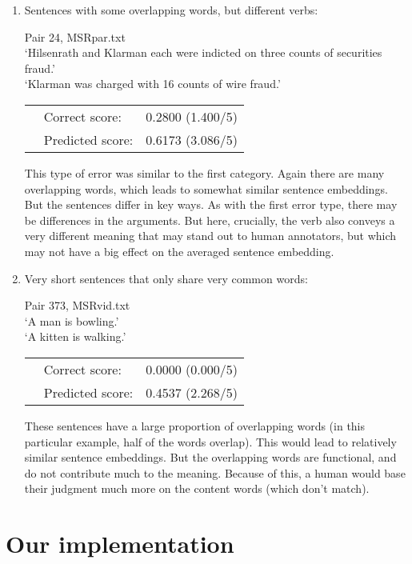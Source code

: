 \documentclass{article}
\begin{document}
\begin{enumerate}
	\item Sentences with some overlapping words, but different verbs:
	
	Pair 24, MSRpar.txt\\
	`Hilsenrath and Klarman each were indicted on three counts of securities fraud.'\\
	`Klarman was charged with 16 counts of wire fraud.'\\
	 \begin{tabular}{lll}
	&	Correct score: & 0.2800 (1.400/5)\\
	& Predicted score: & 0.6173 (3.086/5)\\
	\end{tabular}	
	
	This type of error was similar to the first category. Again there are many overlapping words, which leads to somewhat similar sentence embeddings. But the sentences differ in key ways. As with the first error type, there may be differences in the arguments. But here, crucially, the verb also conveys a very different meaning that may stand out to human annotators, but which may not have a big effect on the averaged sentence embedding.
	
	\item Very short sentences that only share very common words:
	
	Pair 373, MSRvid.txt\\
	`A man is bowling.'\\
	`A kitten is walking.'\\
	 \begin{tabular}{lll}
	&	Correct score: & 0.0000 (0.000/5)\\
	& Predicted score: & 0.4537 (2.268/5)\\
	\end{tabular}	

	These sentences have a large proportion of overlapping words (in this particular example, half of the words overlap). This would lead to relatively similar sentence embeddings. But the overlapping words are functional, and do not contribute much to the meaning. Because of this, a human would base their judgment much more on the content words (which don't match). 
\end{enumerate}



\section{Our implementation}
\end{document}
